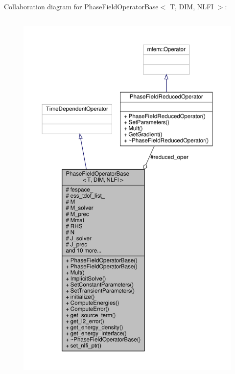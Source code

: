 Collaboration diagram for Phase\+Field\+Operator\+Base$<$ T, D\+IM, N\+L\+FI $>$\+:\nopagebreak
\begin{figure}[H]
\begin{center}
\leavevmode
\includegraphics[height=550pt]{classPhaseFieldOperatorBase__coll__graph}
\end{center}
\end{figure}
